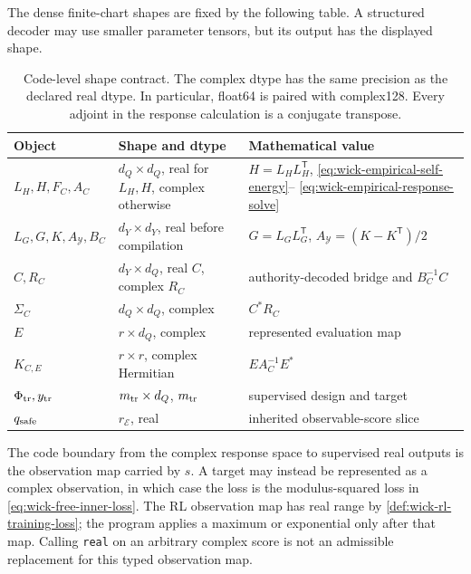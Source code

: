\documentclass[11pt]{article}
\numberwithin{section}{part}
\theoremstyle{plain}
\theoremstyle{definition}
\theoremstyle{remark}
\begin{document}
The dense finite-chart shapes are fixed by the following table.  A structured
decoder may use smaller parameter tensors, but its output has the displayed
shape.
\begin{table}[htbp]
\centering
\small
\begin{tabular}{@{}lll@{}}
\toprule
Object & Shape and dtype & Mathematical value\\
\midrule
\(L_H,H,F_C,A_C\) & \(d_Q\times d_Q\), real for \(L_H,H\), complex otherwise
  & \(H=L_HL_H^{\mathsf T}\), \eqref{eq:wick-empirical-self-energy}--
    \eqref{eq:wick-empirical-response-solve}\\
\(L_G,G,K,A_{\mathcal Y},B_C\) & \(d_Y\times d_Y\), real before compilation
  & \(G=L_GL_G^{\mathsf T}\),
    \(A_{\mathcal Y}=(K-K^{\mathsf T})/2\)\\
\(C,R_C\) & \(d_Y\times d_Q\), real \(C\), complex \(R_C\)
  & authority-decoded bridge and \(B_C^{-1}C\)\\
\(\Sigma_C\) & \(d_Q\times d_Q\), complex
  & \(C^*R_C\)\\
\(E\) & \(r\times d_Q\), complex
  & represented evaluation map\\
\(K_{C,E}\) & \(r\times r\), complex Hermitian
  & \(E A_C^{-1}E^*\)\\
\(\Phi_{\rm tr},y_{\rm tr}\) & \(m_{\rm tr}\times d_Q\), \(m_{\rm tr}\)
  & supervised design and target\\
\(q_{\rm safe}\) & \(r_{\mathscr E}\), real
  & inherited observable-score slice\\
\bottomrule
\end{tabular}
\caption{Code-level shape contract.  The complex dtype has the same precision
as the declared real dtype.  In particular, float64 is paired with complex128.
Every adjoint in the response calculation is a conjugate transpose.}
\label{tab:wick-code-shape-contract}
\end{table}

The code boundary from the complex response space to supervised real outputs
is the observation map carried by \(s\).  A target may instead be represented
as a complex observation, in which case the loss is the modulus-squared loss
in \eqref{eq:wick-free-inner-loss}.  The RL observation map has real range by
\cref{def:wick-rl-training-loss}; the program applies a maximum or exponential
only after that map.  Calling \texttt{real} on an arbitrary complex score is
not an admissible replacement for this typed observation map.
\end{document}

